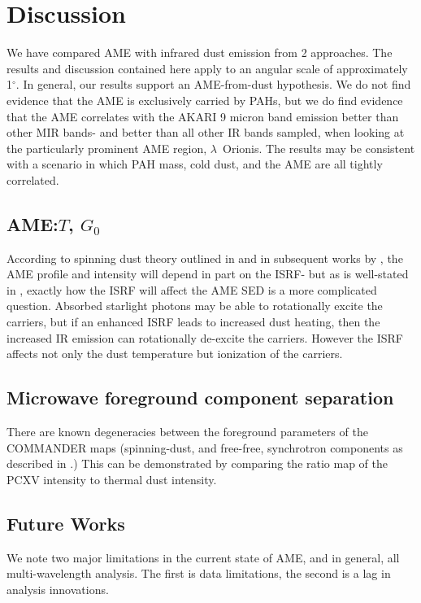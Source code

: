 \chapter{Discussion}
  \label{ch:discussion}

    We have compared AME with infrared dust emission from 2 approaches. The results and discussion contained here apply to an angular scale of approximately 1$^{\circ}$. In general, our results support an AME-from-dust hypothesis. We do not find evidence that the AME is exclusively carried by PAHs, but we do find evidence that the AME correlates with the AKARI 9 micron band emission better than other MIR bands- and better than all other IR bands sampled, when looking at the particularly prominent AME region, $\lambda$~Orionis. The results may be consistent with a scenario in which PAH mass, cold dust, and the AME are all tightly correlated.

\section{AME:$T$, $G_{0}$}

    According to spinning dust theory outlined in \cite{draine98a} and in subsequent works by \cite{ysard10a}, the AME profile and intensity will depend in part on the ISRF- but as is well-stated in \cite{hensley17a}, exactly how the ISRF will affect the AME SED is a more complicated question. Absorbed starlight photons may be able to rotationally excite the carriers, but if an enhanced ISRF leads to increased dust heating, then the increased IR emission can rotationally de-excite the carriers. However the ISRF affects not only the dust temperature but ionization of the carriers.


\section{Microwave foreground component separation}

    There are known degeneracies between the foreground parameters of the COMMANDER maps (spinning-dust, and free-free, synchrotron components as described in \cite{planck15X}.) This can be demonstrated by comparing the ratio map of the PCXV intensity to thermal dust intensity.
\section{Future Works}
    We note two major limitations in the current state of AME, and in general, all multi-wavelength analysis.
    The first is data limitations, the second is a lag in analysis innovations.

